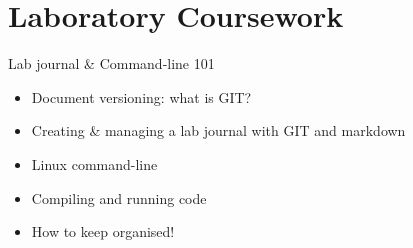 \documentclass[compress]{beamer}
\begin{document}
\section{Laboratory Coursework}

\begin{frame}{Lab journal \& Command-line 101}
    \begin{itemize}
        \item Document versioning: what is GIT?
        \item Creating \& managing a lab journal with GIT and markdown
        \item Linux command-line
        \item Compiling and running code
        \item How to keep organised!
    \end{itemize}
\end{frame}
\end{document}
